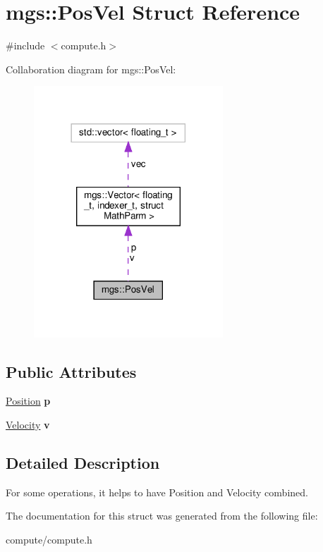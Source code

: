 \hypertarget{structmgs_1_1PosVel}{}\section{mgs\+:\+:Pos\+Vel Struct Reference}
\label{structmgs_1_1PosVel}


{\ttfamily \#include $<$compute.\+h$>$}



Collaboration diagram for mgs\+:\+:Pos\+Vel\+:
\nopagebreak
\begin{figure}[H]
\begin{center}
\leavevmode
\includegraphics[width=201pt]{structmgs_1_1PosVel__coll__graph}
\end{center}
\end{figure}
\subsection*{Public Attributes}
\begin{DoxyCompactItemize}
\item 
\mbox{\label{structmgs_1_1PosVel_aa4b735462e2bb5beae231fabfe600f0c}} 
\hyperlink{structmgs_1_1Vector}{Position} {\bfseries p}
\item 
\mbox{\label{structmgs_1_1PosVel_a98404c9fccdf75eed22a077250f60d2e}} 
\hyperlink{structmgs_1_1Vector}{Velocity} {\bfseries v}
\end{DoxyCompactItemize}


\subsection{Detailed Description}
For some operations, it helps to have Position and Velocity combined. 

The documentation for this struct was generated from the following file\+:\begin{DoxyCompactItemize}
\item 
compute/compute.\+h\end{DoxyCompactItemize}
